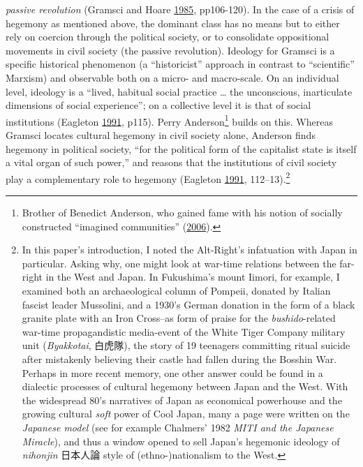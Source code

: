 \documentclass[10pt,british,A4paper,,openany]{memoir}
\begin{document}
\emph{passive revolution} (Gramsci and Hoare
\protect\hyperlink{ref-gramsci_selections_1985}{1985}, pp106-120). In
the case of a crisis of hegemony as mentioned above, the dominant class
has no means but to either rely on coercion through the political
society, or to consolidate oppositional movements in civil society (the
passive revolution). Ideology for Gramsci is a specific historical
phenomenon (a ``historicist'' approach in contrast to ``scientific''
Marxism) and observable both on a micro- and macro-scale. On an
individual level, ideology is a ``lived, habitual social practice
\ldots{} the unconscious, inarticulate dimensions of social
experience''; on a collective level it is that of social institutions
(Eagleton \protect\hyperlink{ref-eagleton_ideology:_1991}{1991}, p115).
Perry Anderson\footnote{Brother of Benedict Anderson, who gained fame
  with his notion of socially constructed ``imagined communities''
  (\protect\hyperlink{ref-anderson_imagined_2006}{2006}).} builds on
this. Whereas Gramsci locates cultural hegemony in civil society alone,
Anderson finds hegemony in political society, ``for the political form
of the capitalist state is itself a vital organ of such power,'' and
reasons that the institutions of civil society play a complementary role
to hegemony (Eagleton
\protect\hyperlink{ref-eagleton_ideology:_1991}{1991},
112--13).\footnote{In this paper's introduction, I noted the Alt-Right's
  infatuation with Japan in particular. Asking why, one might look at
  war-time relations between the far-right in the West and Japan. In
  Fukushima's mount Iimori, for example, I examined both an
  archaeological column of Pompeii, donated by Italian fascist leader
  Mussolini, and a 1930's German donation in the form of a black granite
  plate with an Iron Cross--as form of praise for the
  \emph{bushido}-related war-time propagandistic media-event of the
  White Tiger Company military unit (\emph{Byakkotai}, 白虎隊), the
  story of 19 teenagers committing ritual suicide after mistakenly
  believing their castle had fallen during the Bosshin War. Perhaps in
  more recent memory, one other answer could be found in a dialectic
  processes of cultural hegemony between Japan and the West. With the
  widespread 80's narratives of Japan as economical powerhouse and the
  growing cultural \emph{soft} power of Cool Japan, many a page were
  written on the \emph{Japanese model} (see for example Chalmers' 1982
  \emph{MITI and the Japanese Miracle}), and thus a window opened to
  sell Japan's hegemonic ideology of \emph{nihonjin} 日本人論 style of
  (ethno-)nationalism to the West.}
\end{document}
